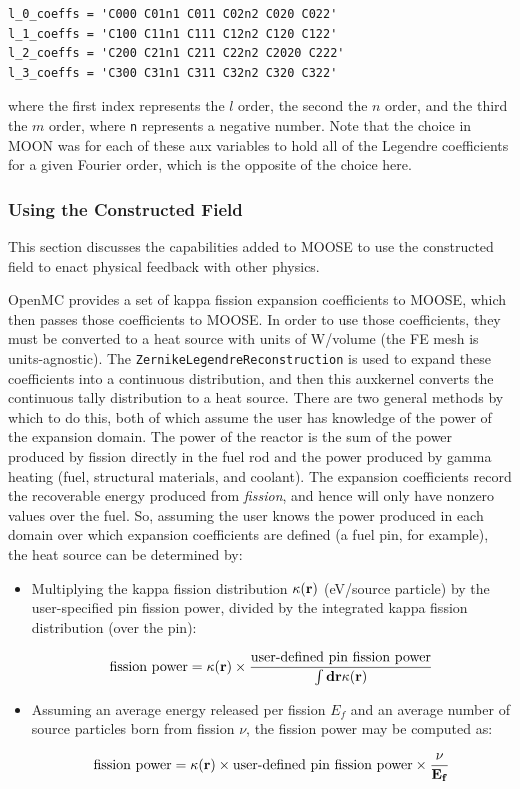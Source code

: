 \documentclass[10pt]{article}
\newcommand{\beq}{\begin{equation}}
\newcommand{\eeq}{\end{equation}}
\newcounter{subsubsubsection}[subsubsection]
\numberwithin{equation}{section} %
\begin{document}
\begin{lstlisting}
l_0_coeffs = 'C000 C01n1 C011 C02n2 C020 C022'
l_1_coeffs = 'C100 C11n1 C111 C12n2 C120 C122'
l_2_coeffs = 'C200 C21n1 C211 C22n2 C2020 C222'
l_3_coeffs = 'C300 C31n1 C311 C32n2 C320 C322'
\end{lstlisting}

where the first index represents the \(l\) order, the second the \(n\) order, and the third the \(m\) order, where {\tt n} represents a negative number. Note that the choice in MOON was for each of these aux variables to hold all of the Legendre coefficients for a given Fourier order, which is the opposite of the choice here. 

\subsubsection{Using the Constructed Field}
This section discusses the capabilities added to MOOSE to use the constructed field to enact physical feedback with other physics.

OpenMC provides a set of kappa fission expansion coefficients to MOOSE, which then passes those coefficients to MOOSE. In order to use those coefficients, they must be converted to a heat source with units of W/volume (the FE mesh is units-agnostic). The {\tt ZernikeLegendreReconstruction} is used to expand these coefficients into a continuous distribution, and then this auxkernel converts the continuous tally distribution to a heat source. There are two general methods by which to do this, both of which assume the user has knowledge of the power of the expansion domain. The power of the reactor is the sum of the power produced by fission directly in the fuel rod and the power produced by gamma heating (fuel, structural materials, and coolant). The expansion coefficients record the recoverable energy produced from {\it fission}, and hence will only have nonzero values over the fuel. So, assuming the user knows the power produced in each domain over which expansion coefficients are defined (a fuel pin, for example), the heat source can be determined by: 

\begin{itemize}
\item Multiplying the kappa fission distribution \(\kappa(\bf{r})\) (eV/source particle) by the user-specified pin fission power, divided by the integrated kappa fission distribution (over the pin):

\beq
\textrm{fission power}=\kappa(\bf{r})\times\frac{\textrm{user-defined pin fission power}}{\int d\bf{r}\kappa({\bf r})}
\eeq

\item Assuming an average energy released per fission \(E_f\) and an average number of source particles born from fission \(\nu\), the fission power may be computed as:

\beq
\textrm{fission power}=\kappa(\bf{r})\times\textrm{user-defined pin fission power}\times\frac{\nu}{E_f}
\eeq
\end{itemize}
\end{document}
